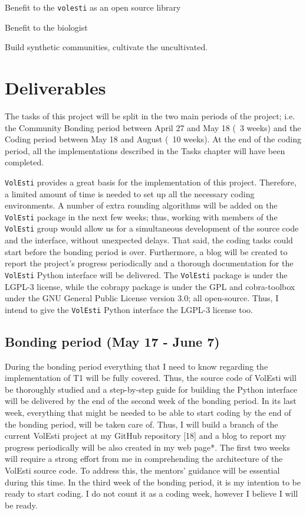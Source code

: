\documentclass{article}
\begin{document}
Benefit to the \texttt{volesti} as an open source library

Benefit to the biologist 


Build synthetic communities, cultivate the uncultivated. 

\section{Deliverables}


The tasks of this project will be split in the two main periods of the project; i.e. the Community Bonding period between April 27 and May 18 (~3 weeks) and the Coding period between May 18 and August (~10 weeks). 
At the end of the coding period, all the implementations described in the Tasks chapter will have been completed. 

\texttt{VolEsti} provides a great basis for the implementation of this project. 
Therefore, a limited amount of time is needed  to set up all the necessary coding environments. 
A number of extra rounding algorithms will be added on the \texttt{VolEsti} package in the next few weeks; thus, working with members of the \texttt{VolEsti} group would allow us for a simultaneous  development of the source code and the interface, without unexpected delays. That said, the coding tasks could start before the bonding period is over. 
Furthermore, a blog will be created to report the project’s progress periodically and a thorough documentation for the \texttt{VolEsti} Python interface will be delivered. The \texttt{VolEsti} package is under the LGPL-3 license, while the cobrapy package is under the GPL and cobra-toolbox under the GNU General Public License version 3.0; all open-source. Thus, I intend to give the  \texttt{VolEsti} Python interface the LGPL-3 license too. 



\subsection{Bonding period (May 17 - June 7)}
During the bonding period everything that I need to know regarding the implementation of T1 will be fully covered. 
Thus, the source code of VolEsti will be thoroughly studied and a step-by-step guide for building the Python interface will be delivered by the end of the second week of the bonding period. 
In its last week, everything that might be needed to be able to start coding by the end of the bonding period, will be taken care of.
Thus, I will build a branch of the current VolEsti project at my GitHub repository [18] and a blog to report my progress periodically will be also created in my web page*. 
The first two weeks will require a strong effort from me in comprehending the architecture of the VolEsti source code. 
To address this, the mentors’ guidance will be essential during this time. 
In the third week of the bonding period, it is my intention to be ready to start coding. I do not count it as a coding week, however I believe I will be ready.
\end{document}
